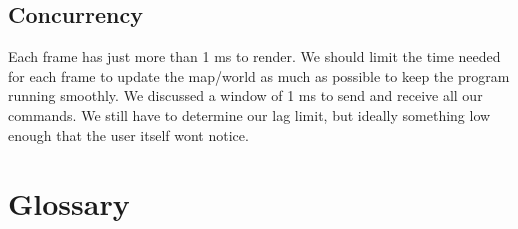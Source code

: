 \documentclass[11pt]{article}
\begin{document}
    \subsection{Concurrency}
    Each frame has just more than 1 ms to render. We should limit the time needed for each frame to update the map/world as much as possible to keep the program running smoothly. We discussed a window of 1 ms to send and receive all our commands. 
    We still have to determine our lag limit, but ideally something low enough that the user itself wont notice. 

\section{Glossary}
\printglossary[title=]
\end{document}
